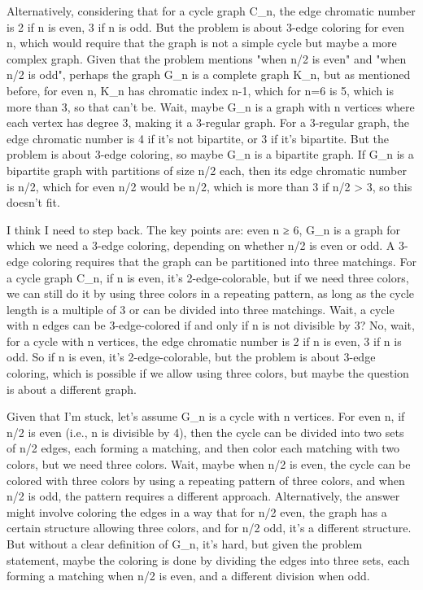 Alternatively, considering that for a cycle graph C_n, the edge chromatic number is 2 if n is even, 3 if n is odd. But the problem is about 3-edge coloring for even n, which would require that the graph is not a simple cycle but maybe a more complex graph. Given that the problem mentions "when n/2 is even" and "when n/2 is odd", perhaps the graph G_n is a complete graph K_n, but as mentioned before, for even n, K_n has chromatic index n-1, which for n=6 is 5, which is more than 3, so that can't be. Wait, maybe G_n is a graph with n vertices where each vertex has degree 3, making it a 3-regular graph. For a 3-regular graph, the edge chromatic number is 4 if it's not bipartite, or 3 if it's bipartite. But the problem is about 3-edge coloring, so maybe G_n is a bipartite graph. If G_n is a bipartite graph with partitions of size n/2 each, then its edge chromatic number is n/2, which for even n/2 would be n/2, which is more than 3 if n/2 > 3, so this doesn't fit.

I think I need to step back. The key points are: even n ≥ 6, G_n is a graph for which we need a 3-edge coloring, depending on whether n/2 is even or odd. A 3-edge coloring requires that the graph can be partitioned into three matchings. For a cycle graph C_n, if n is even, it's 2-edge-colorable, but if we need three colors, we can still do it by using three colors in a repeating pattern, as long as the cycle length is a multiple of 3 or can be divided into three matchings. Wait, a cycle with n edges can be 3-edge-colored if and only if n is not divisible by 3? No, wait, for a cycle with n vertices, the edge chromatic number is 2 if n is even, 3 if n is odd. So if n is even, it's 2-edge-colorable, but the problem is about 3-edge coloring, which is possible if we allow using three colors, but maybe the question is about a different graph.

Given that I'm stuck, let's assume G_n is a cycle with n vertices. For even n, if n/2 is even (i.e., n is divisible by 4), then the cycle can be divided into two sets of n/2 edges, each forming a matching, and then color each matching with two colors, but we need three colors. Wait, maybe when n/2 is even, the cycle can be colored with three colors by using a repeating pattern of three colors, and when n/2 is odd, the pattern requires a different approach. Alternatively, the answer might involve coloring the edges in a way that for n/2 even, the graph has a certain structure allowing three colors, and for n/2 odd, it's a different structure. But without a clear definition of G_n, it's hard, but given the problem statement, maybe the coloring is done by dividing the edges into three sets, each forming a matching when n/2 is even, and a different division when odd.

